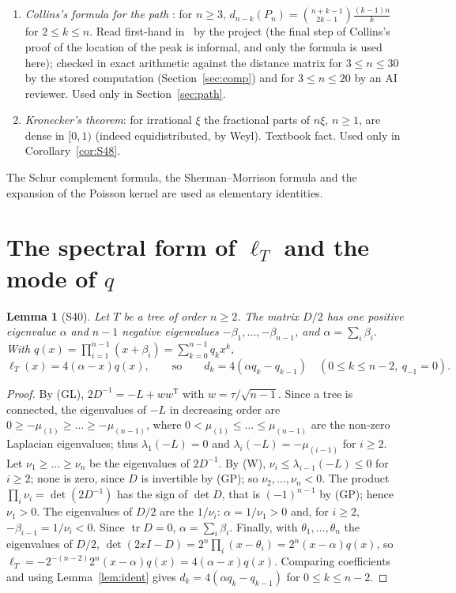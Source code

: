 \documentclass[11pt]{amsart}
\newtheorem{lemma}[theorem]{Lemma}
\theoremstyle{definition}
\theoremstyle{remark}
\newcommand{\tr}{\operatorname{tr}}
\begin{document}
\begin{enumerate}
are $2-2\cos(j\pi/n)$, $0\le j\le n-1$. Textbook fact (e.g.\ \cite{BH});
confirmed indirectly by the exact checks of Lemma~\ref{lem:S46}.
\item[(C)] \emph{Collins's formula for the path} \cite[Theorem~3 and its
proof, p.~31]{Col89}: for $n\ge3$,
$d_{n-k}(P_n)=\binom{n+k-1}{2k-1}\frac{(k-1)n}{k}$ for $2\le k\le n$. Read
first-hand in~\cite{Col89} by the project (the final step of Collins's proof
of the location of the peak is informal, and only the formula is used here);
checked in exact arithmetic against the distance matrix for $3\le n\le30$ by
the stored computation (Section~\ref{sec:comp}) and for $3\le n\le20$ by an
AI reviewer. Used only in Section~\ref{sec:path}.
\item[(K)] \emph{Kronecker's theorem}: for irrational $\xi$ the fractional
parts of $n\xi$, $n\ge1$, are dense in $[0,1)$ (indeed equidistributed, by
Weyl). Textbook fact. Used only in Corollary~\ref{cor:S48}.
\end{enumerate}
The Schur complement formula, the Sherman--Morrison formula and the
expansion of the Poisson kernel are used as elementary identities.

\section{The spectral form of \texorpdfstring{$\ell_T$}{l\_T} and the mode of \texorpdfstring{$q$}{q}}\label{sec:spectral}

\begin{lemma}[S40]\label{lem:S40}
Let $T$ be a tree of order $n\ge2$. The matrix $D/2$ has one positive
eigenvalue $\alpha$ and $n-1$ negative eigenvalues
$-\beta_1,\dots,-\beta_{n-1}$, and $\alpha=\sum_i\beta_i$. With
$q(x)=\prod_{i=1}^{n-1}(x+\beta_i)=\sum_{k=0}^{n-1}q_kx^k$,
\[
\ell_T(x)=4(\alpha-x)q(x),\qquad\text{so}\qquad d_k=4(\alpha q_k-q_{k-1})
\quad(0\le k\le n-2,\ q_{-1}=0).
\]
\end{lemma}

\begin{proof}
By (GL), $2D^{-1}=-L+ww^{\mathsf T}$ with $w=\tau/\sqrt{n-1}$. Since a tree is
connected, the eigenvalues of $-L$ in decreasing order are
$0\ge-\mu_{(1)}\ge\dots\ge-\mu_{(n-1)}$, where
$0<\mu_{(1)}\le\dots\le\mu_{(n-1)}$ are the non-zero Laplacian eigenvalues;
thus $\lambda_1(-L)=0$ and $\lambda_i(-L)=-\mu_{(i-1)}$ for $i\ge2$. Let
$\nu_1\ge\dots\ge\nu_n$ be the eigenvalues of $2D^{-1}$. By (W),
$\nu_i\le\lambda_{i-1}(-L)\le0$ for $i\ge2$; none is zero, since $D$ is
invertible by (GP); so $\nu_2,\dots,\nu_n<0$. The product $\prod_i\nu_i=\det(2D^{-1})$
has the sign of $\det D$, that is $(-1)^{n-1}$ by (GP); hence $\nu_1>0$. The
eigenvalues of $D/2$ are the $1/\nu_i$: $\alpha=1/\nu_1>0$ and, for $i\ge2$,
$-\beta_{i-1}=1/\nu_i<0$. Since $\tr D=0$, $\alpha=\sum_i\beta_i$. Finally,
with $\theta_1,\dots,\theta_n$ the eigenvalues of $D/2$,
$\det(2xI-D)=2^n\prod_i(x-\theta_i)=2^n(x-\alpha)q(x)$, so
$\ell_T=-2^{-(n-2)}2^n(x-\alpha)q(x)=4(\alpha-x)q(x)$. Comparing coefficients
and using Lemma~\ref{lem:ident} gives $d_k=4(\alpha q_k-q_{k-1})$ for
$0\le k\le n-2$.
\end{proof}
\end{document}
